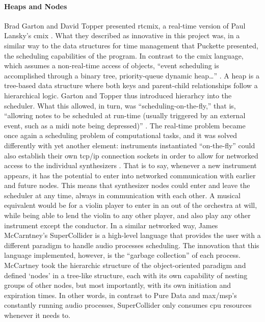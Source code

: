 	\paragraph{Heaps and Nodes}
	Brad Garton and David Topper presented \gls{rtcmix}, a real-time version of Paul Lansky's \gls{cmix} \parencite{DBLP:conf/icmc/Lansky90}. What they described as innovative in this project was, in a similar way to the data structures for time management that Puckette presented, the scheduling capabilities of the program. In contrast to the \gls{cmix} language, which assumes a non-real-time access of objects, ``event scheduling is accomplished through a binary tree, priority-queue dynamic heap\dots '' \parencite{DBLP:conf/icmc/GartonT97}. A heap is a tree-based data structure where both keys and parent-child relationships follow a hierarchical logic. Garton and Topper thus introduced hierarhcy into the scheduler. What this allowed, in turn, was ``scheduling-on-the-fly,'' that is, ``allowing notes to be scheduled at run-time (usually triggered by an external event, such as a \gls{midi} note being depressed)'' \parencite{DBLP:conf/icmc/GartonT97}. The real-time problem became once again a scheduling problem of computational tasks, and it was solved differently with yet another element: instruments instantiated ``on-the-fly'' could also establish their own \gls{tcp/ip} connection sockets in order to allow for networked access to the individual synthesizers \parencite{DBLP:conf/icmc/GartonT97}. That is to say, whenever a new instrument appears, it has the potential to enter into networked communication with earlier and future nodes. This means that synthesizer nodes could enter and leave the scheduler at any time, always in communication with each other. A musical equivalent would be for a violin player to enter in an out of the orchestra at will, while being able to lend the violin to any other player, and also play any other instrument except the conductor. In a similar networked way, James McCarntney's SuperCollider \parencite{DBLP:conf/icmc/McCartney96, DBLP:conf/icmc/McCartney98} is a high-level language that provides the user with a different paradigm to handle audio processes scheduling. The innovation that this language implemented, however, is the ``garbage collection'' of each process. McCartney took the hierarchic structure of the object-oriented paradigm and defined `nodes' in a tree-like structure, each with its own capability of nesting groups of other nodes, but most importantly, with its own initiation and expiration times. In other words, in contrast to Pure Data and \gls{max/msp}'s constantly running audio processes, SuperCollider only consumes \gls{cpu} resources whenever it needs to.


